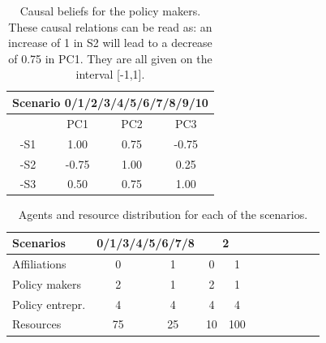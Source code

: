 \documentclass[12pt]{article}
\begin{document}
\begin{table}[h!]
\begin{center}
\begin{tabular}{ |c|c|c|c|}
\hline
\multicolumn{4}{|c|}{ {\bfseries Scenario 0/1/2/3/4/5/6/7/8/9/10}}	
								\\ \hline \hline
	& PC1	& PC2	& PC3		\\ \hline
-S1 	& 1.00	& 0.75	&-0.75		\\ \hline
-S2 	&-0.75	& 1.00	& 0.25 		\\ \hline
-S3 	& 0.50	& 0.75	& 1.00		\\ 
\hline
\end{tabular}
\end{center}
\caption{Causal beliefs for the policy makers. These causal relations can be read as: an increase of 1 in S2 will lead to a decrease of 0.75 in PC1. They are all given on the interval [-1,1].}
\label{tab:causalBeliefs}
\end{table}

\begin{table}[h!]
\begin{center}
\begin{tabular}{ |l||c|c||c|c||c|c||c|c||c|c| } 
\hline
 {\bfseries Scenarios}
 				& \multicolumn{2}{|c||}{ {\bfseries 0/1/3/4/5/6/7/8}}	
						& \multicolumn{2}{|c||}{ {\bfseries 2}}	
														\\ \hline \hline
Affiliations			& 0	& 1	& 0	& 1		\\ \hline
Policy makers 		& 2	& 1	& 2	& 1		\\ \hline
Policy entrepr.		& 4	& 4	& 4	& 4		\\ \hline
Resources		& 75	& 25	& 10	& 100	\\ \hline
\end{tabular}
\end{center}
\caption{Agents and resource distribution for each of the scenarios.}
\label{tab:agentResourceDistribution}
\end{table}
\end{document}

